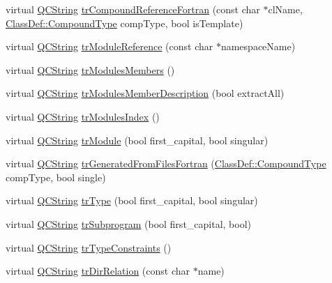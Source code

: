 \begin{DoxyCompactItemize}
\item 
virtual \mbox{\hyperlink{class_q_c_string}{Q\+C\+String}} \mbox{\hyperlink{class_translator_swedish_abc2e7283102c2c782c827e9a493fa176}{tr\+Compound\+Reference\+Fortran}} (const char $\ast$cl\+Name, \mbox{\hyperlink{class_class_def_ae70cf86d35fe954a94c566fbcfc87939}{Class\+Def\+::\+Compound\+Type}} comp\+Type, bool is\+Template)
\item 
virtual \mbox{\hyperlink{class_q_c_string}{Q\+C\+String}} \mbox{\hyperlink{class_translator_swedish_a1fc7559a678495bfc69c61f1814e9654}{tr\+Module\+Reference}} (const char $\ast$namespace\+Name)
\item 
virtual \mbox{\hyperlink{class_q_c_string}{Q\+C\+String}} \mbox{\hyperlink{class_translator_swedish_ac558b9172dae70014081872abeb0424a}{tr\+Modules\+Members}} ()
\item 
virtual \mbox{\hyperlink{class_q_c_string}{Q\+C\+String}} \mbox{\hyperlink{class_translator_swedish_aa85dc0feb681133b4592cad3c90720b9}{tr\+Modules\+Member\+Description}} (bool extract\+All)
\item 
virtual \mbox{\hyperlink{class_q_c_string}{Q\+C\+String}} \mbox{\hyperlink{class_translator_swedish_ad3c96e98310c6d8988a61fa7b37ad440}{tr\+Modules\+Index}} ()
\item 
virtual \mbox{\hyperlink{class_q_c_string}{Q\+C\+String}} \mbox{\hyperlink{class_translator_swedish_a081eed26a5fb7b222d6359c37cb02543}{tr\+Module}} (bool first\+\_\+capital, bool singular)
\item 
virtual \mbox{\hyperlink{class_q_c_string}{Q\+C\+String}} \mbox{\hyperlink{class_translator_swedish_a634e31e70dca60b2d9118c57b484eb2f}{tr\+Generated\+From\+Files\+Fortran}} (\mbox{\hyperlink{class_class_def_ae70cf86d35fe954a94c566fbcfc87939}{Class\+Def\+::\+Compound\+Type}} comp\+Type, bool single)
\item 
virtual \mbox{\hyperlink{class_q_c_string}{Q\+C\+String}} \mbox{\hyperlink{class_translator_swedish_a10a94a1f1452e7cff378ae2471f1671d}{tr\+Type}} (bool first\+\_\+capital, bool singular)
\item 
virtual \mbox{\hyperlink{class_q_c_string}{Q\+C\+String}} \mbox{\hyperlink{class_translator_swedish_a1dccde975433a816c2fc9230312b13b0}{tr\+Subprogram}} (bool first\+\_\+capital, bool)
\item 
virtual \mbox{\hyperlink{class_q_c_string}{Q\+C\+String}} \mbox{\hyperlink{class_translator_swedish_acd899397b02f8a3dd1125dcaa8966a1d}{tr\+Type\+Constraints}} ()
\item 
virtual \mbox{\hyperlink{class_q_c_string}{Q\+C\+String}} \mbox{\hyperlink{class_translator_swedish_ae13fe80fbee2ae648049076e42a12039}{tr\+Dir\+Relation}} (const char $\ast$name)

\end{DoxyCompactItemize}
